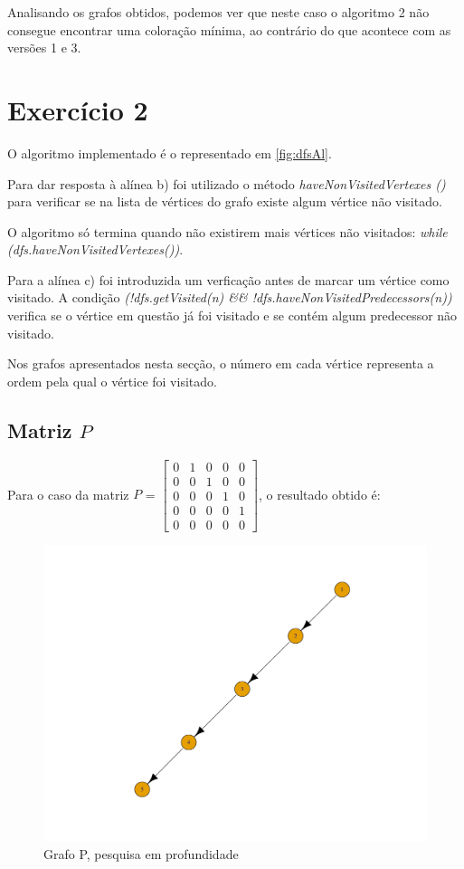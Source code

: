\documentclass[a4paper,12pt]{report}
\begin{document}
Analisando os grafos obtidos, podemos ver que neste caso o algoritmo 2 não consegue encontrar uma coloração mínima, ao contrário do que acontece com as versões 1 e 3.

\section{Exercício 2}

O algoritmo implementado é o representado em \ref{fig:dfsAl}.

Para dar resposta à alínea b) foi utilizado o método \textit{haveNonVisitedVertexes ()} para verificar se na lista de vértices do grafo existe algum vértice não visitado. 

O algoritmo só termina quando não existirem mais vértices não visitados: \textit{while (dfs.haveNonVisitedVertexes())}.

Para a alínea c) foi introduzida um verficação antes de marcar um vértice como visitado. A condição \textit{(!dfs.getVisited(n) \&\& !dfs.haveNonVisitedPredecessors(n))} verifica se o vértice em questão já foi visitado e se contém algum predecessor não visitado.

Nos grafos apresentados nesta secção, o número em cada vértice representa a ordem pela qual o vértice foi visitado.

\subsection*{Matriz $P$}

Para o caso da matriz $P$ = $\begin{bmatrix}
    0&1&0&0&0\\
    0&0&1&0&0\\
    0&0&0&1&0\\
    0&0&0&0&1\\
    0&0&0&0&0
\end{bmatrix}$, o resultado obtido é:
\begin{figure}[H]
    \centering
        \includegraphics[scale=0.25]{img/dfsP.pdf}
    \caption{Grafo P, pesquisa em profundidade}
    \label{fig:dfsP}
\end{figure}
\end{document}
